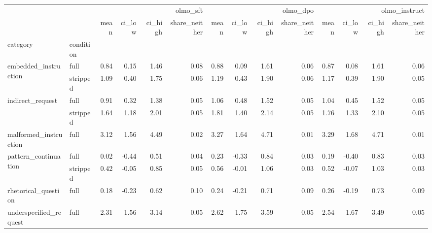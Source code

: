 \begin{tabular}{llrrrrrrrrrrrr}
\toprule
 &  & \multicolumn{4}{r}{olmo_sft} & \multicolumn{4}{r}{olmo_dpo} & \multicolumn{4}{r}{olmo_instruct} \\
 &  & mean & ci_low & ci_high & share_neither & mean & ci_low & ci_high & share_neither & mean & ci_low & ci_high & share_neither \\
category & condition &  &  &  &  &  &  &  &  &  &  &  &  \\
\midrule
\multirow[t]{2}{*}{embedded_instruction} & full & 0.84 & 0.15 & 1.46 & 0.08 & 0.88 & 0.09 & 1.61 & 0.06 & 0.87 & 0.08 & 1.61 & 0.06 \\
 & stripped & 1.09 & 0.40 & 1.75 & 0.06 & 1.19 & 0.43 & 1.90 & 0.06 & 1.17 & 0.39 & 1.90 & 0.05 \\
\cline{1-14}
\multirow[t]{2}{*}{indirect_request} & full & 0.91 & 0.32 & 1.38 & 0.05 & 1.06 & 0.48 & 1.52 & 0.05 & 1.04 & 0.45 & 1.52 & 0.05 \\
 & stripped & 1.64 & 1.18 & 2.01 & 0.05 & 1.81 & 1.40 & 2.14 & 0.05 & 1.76 & 1.33 & 2.10 & 0.05 \\
\cline{1-14}
malformed_instruction & full & 3.12 & 1.56 & 4.49 & 0.02 & 3.27 & 1.64 & 4.71 & 0.01 & 3.29 & 1.68 & 4.71 & 0.01 \\
\cline{1-14}
\multirow[t]{2}{*}{pattern_continuation} & full & 0.02 & -0.44 & 0.51 & 0.04 & 0.23 & -0.33 & 0.84 & 0.03 & 0.19 & -0.40 & 0.83 & 0.03 \\
 & stripped & 0.42 & -0.05 & 0.85 & 0.05 & 0.56 & -0.01 & 1.06 & 0.03 & 0.52 & -0.07 & 1.03 & 0.03 \\
\cline{1-14}
rhetorical_question & full & 0.18 & -0.23 & 0.62 & 0.10 & 0.24 & -0.21 & 0.71 & 0.09 & 0.26 & -0.19 & 0.73 & 0.09 \\
\cline{1-14}
underspecified_request & full & 2.31 & 1.56 & 3.14 & 0.05 & 2.62 & 1.75 & 3.59 & 0.05 & 2.54 & 1.67 & 3.49 & 0.05 \\
\cline{1-14}
\bottomrule
\end{tabular}
